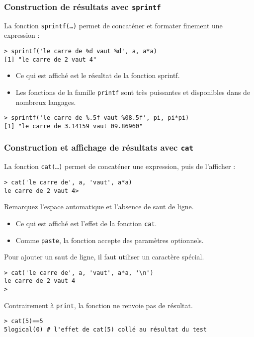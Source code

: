 \documentclass[10pt]{beamer}
\begin{document}
\begin{frame}[fragile]
\frametitle{Construction de résultats avec \texttt{sprintf}}
La fonction \texttt{sprintf(\dots)} permet de concaténer et formater finement une expression :
\begin{lstlisting}
> sprintf('le carre de %d vaut %d', a, a*a)
[1] "le carre de 2 vaut 4"
\end{lstlisting}
\begin{itemize}
\item Ce qui est affiché est le résultat de la fonction sprintf.
\item Les fonctions de la famille \alert{\texttt{printf}} sont très puissantes et disponibles dans de \alert{nombreux langages}.
\end{itemize}
\begin{lstlisting}
> sprintf('le carre de %.5f vaut %08.5f', pi, pi*pi)
[1] "le carre de 3.14159 vaut 09.86960"
\end{lstlisting}
\end{frame}

\begin{frame}[fragile]
\frametitle{Construction et affichage de résultats avec \texttt{cat}}
La fonction \texttt{cat(\dots)} permet de concaténer une expression, puis de l'afficher :
\begin{lstlisting}
> cat('le carre de', a, 'vaut', a*a)
le carre de 2 vaut 4>
\end{lstlisting}
Remarquez l'espace automatique et l'absence de saut de ligne.

\begin{itemize}
\item Ce qui est affiché est l'\alert{effet} de la fonction \texttt{cat}.
\item Comme \texttt{paste}, la fonction accepte des paramètres optionnels.
\end{itemize}

Pour ajouter un saut de ligne, il faut utiliser un \alert{caractère spécial}.
\begin{lstlisting}
> cat('le carre de', a, 'vaut', a*a, '\n')
le carre de 2 vaut 4
>
\end{lstlisting}

Contrairement à \texttt{print}, la fonction ne renvoie pas de résultat.
\begin{lstlisting}
> cat(5)==5
5logical(0) # l'effet de cat(5) collé au résultat du test
\end{lstlisting}
\end{frame}
\end{document}
